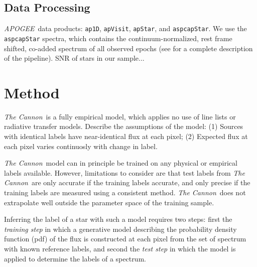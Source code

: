 \documentclass[modern]{aastex62}
\newcommand{\apogee}{\textsl{APOGEE}}
\newcommand{\thecannon}{\textsl{The Cannon}}
\begin{document}


\subsection{Data Processing}

\apogee\ data products: {\tt\string ap1D}, {\tt\string apVisit}, {\tt\string apStar}, and {\tt\string aspcapStar}. We use the {\tt\string aspcapStar} spectra, which contains the continuum-normalized, rest frame shifted, co-added spectrum of all observed epochs (see \citealt{Perez:2016} for a complete description of the pipeline). SNR of stars in our sample...


\section{Method}\label{sec:cannon}

\thecannon\ is a fully empirical model, which applies no use of line lists or radiative transfer models. Describe the assumptions of the model: (1) Sources with identical labels have near-identical flux at each pixel; (2) Expected flux at each pixel varies continuosly with change in label. 

\thecannon\ model can in principle be trained on any physical or empirical labels available. However, limitations to consider are that test labels from \thecannon\ are only accurate if the training labels accurate, and only precise if the training labels are measured using a consistent method. \thecannon\ does not extrapolate well outside the parameter space of the training sample.
\color{gcolor}{HOGG: More notes to add here?}\color{black}

Inferring the label of a star with such a model requires two steps: first the \emph{training step} in which a generative model describing the probability density function (pdf) of the flux is constructed at each pixel from the set of spectrum with known reference labels, and second the \emph{test step} in which the model is applied to determine the labels of a spectrum.
\end{document}
